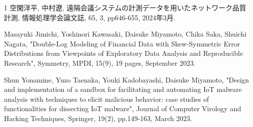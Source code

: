 \begin{雑誌論文}{1}
空閑洋平, 中村遼, 遠隔会議システムの計測データを用いたネットワーク品質計測, 情報処理学会論文誌, 65, 3, pp646-655, 2024年3月.

Masayuki Jimichi, Yoshinori Kawasaki, Daisuke Miyamoto, Chika Saka, Shuichi Nagata,
"Double-Log Modeling of Financial Data with Skew-Symmetric Error Distributions from Viewpoints of Exploratory Data Analysis and Reproducible Research",
Symmetry, MPDI, 15(9), 19 pages, September 2023. 

Shun Yonamine, Yuzo Taenaka, Youki Kadobayashi, Daisuke Miyamoto,
"Design and implementation of a sandbox for facilitating and automating IoT malware analysis with techniques to elicit malicious behavior: case studies of functionalities for dissecting IoT malware",
Journal of Computer Virology and Hacking Techniques, Springer, 19(2), pp.149-163, March 2023.






\end{雑誌論文}

